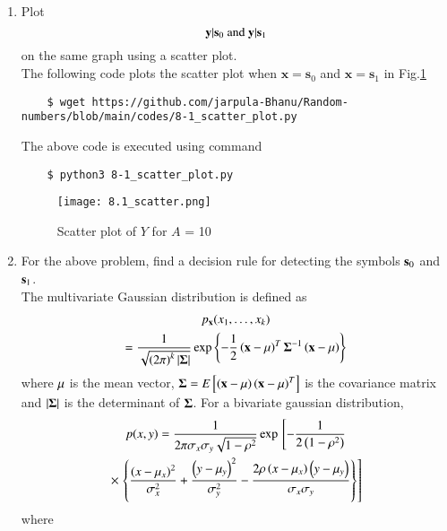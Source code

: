 \documentclass[journal,12pt,twocolumn]{IEEEtran}
\renewcommand\thesection{\arabic{section}}
\begin{document}
\begin{enumerate}[label=\thesection.\arabic*
,ref=\thesection.\theenumi]
\item
\label{ch5_fsk}
Plot 
%
\begin{equation}
\mathbf{y}|\mathbf{s}_0 \text{ and } \mathbf{y}|\mathbf{s}_1
\end{equation}
%
on the same graph using a scatter plot.\\
%
\solution The following code plots the scatter plot when 
$\textbf{x} = \textbf{s}_0$ and $\textbf{x} = \textbf{s}_1$ in Fig.\ref{fig:8.1_scatter}
\begin{lstlisting}
    $ wget https://github.com/jarpula-Bhanu/Random-numbers/blob/main/codes/8-1_scatter_plot.py
    \end{lstlisting}
    The above code is executed using command
    \begin{lstlisting}
    $ python3 8-1_scatter_plot.py
    \end{lstlisting}
    \begin{figure}[h]
        \centering
        \texttt{[image: 8.1\_scatter.png]}
        \caption{Scatter plot of $Y$ for $A$ = 10}
        \label{fig:8.1_scatter}
    \end{figure}
\item
For the above problem, find a decision rule for detecting the symbols $\mathbf{s}_0 $ and $\mathbf{s}_1$.\\
%
\solution The multivariate Gaussian distribution is defined as
%
\begin{multline}
\label{eq:multivariate}
p_{\mathbf{x}}(x_1,\dots,x_k)
\\
=\frac{1}{\sqrt{\left(2\pi\right)^k\left\vert\mathbf{\Sigma}\right\vert}}\exp\left\{-\frac{1}{2}\left(\mathbf{x}-\mathbf{\mu}\right)^T\mathbf{\Sigma}^{-1}\left(\mathbf{x}-\mathbf{\mu}\right)\right\}
\end{multline}
%
where $\mathbf{\mu}$ is the mean vector, $\mathbf{\Sigma} = E{}\left[\left(\mathbf{x}-\mathbf{\mu}\right)\left(\mathbf{x}-\mathbf{\mu}\right)^T\right]$ is the covariance matrix and $\left\vert\mathbf{\Sigma}\right\vert$ is the determinant of $\mathbf{\Sigma}$.
For a bivariate gaussian distribution,
{\small
\begin{multline}
\label{eq:bivariate}
p(x,y)= \frac{1}{2\pi \sigma_x\sigma_y\sqrt{1-\rho^2}}\exp{}\left[-\frac{1}{2\left(1-\rho^2\right)}\right.
\\
\times {}\left.\left\{\frac{\left(x-\mu_x\right)^2}{\sigma_x^2}+\frac{\left(y-\mu_y\right)^2}{\sigma_y^2}-\frac{2\rho\left(x-\mu_x\right)\left(y-\mu_y\right)}{\sigma_x\sigma_y}\right\}\right]
\end{multline}
}
%
where
%
\begin{align}

\end{align}
\end{enumerate}
\end{document}
